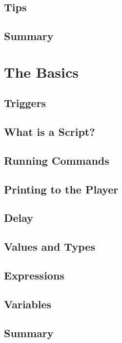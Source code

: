 \documentclass[oneside]{book}
\begin{document}
\section{Tips}
\blindtext

\section{Summary}
\blindtext

\chapter{The Basics}

\section{Triggers}
\blindtext

\section{What is a Script?}
\blindtext

\section{Running Commands}
\blindtext

\section{Printing to the Player}
\blindtext

\section{Delay}
\blindtext

\section{Values and Types}
\blindtext

\section{Expressions}
\blindtext

\section{Variables}
\blindtext

\section{Summary}
\blindtext
\end{document}
